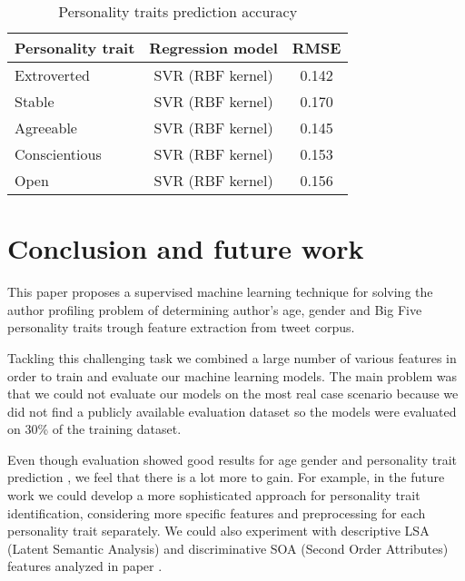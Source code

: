 \documentclass[10pt, a4paper]{article}
\begin{document}
\begin{table}[h]
\vspace{1mm}
\caption{Personality traits prediction accuracy}
\label{tab:narrow-table-4}
\vspace{-6mm}
\begin{center}
\begin{tabular}{lcc}
\midrule
Personality trait & Regression model & RMSE\\
\midrule
 Extroverted & SVR  (RBF kernel) & 0.142 \\
 Stable & SVR (RBF kernel)& 0.170 \\
 Agreeable & SVR  (RBF kernel)& 0.145 \\
 Conscientious & SVR  (RBF kernel)  & 0.153 \\
 Open & SVR  (RBF kernel) & 0.156 \\
\bottomrule
\end{tabular}
\end{center}
\end{table}
\par

\section{Conclusion and future work}

This paper proposes a supervised machine learning technique for solving the author profiling problem of determining author's age, gender and Big Five personality traits trough feature extraction from tweet corpus. 
\par
Tackling this challenging task we combined a large number of various features in order to train and evaluate our machine learning models. The main problem was that we could not evaluate our models on the most real case scenario because we did not find a publicly available evaluation dataset so the models were evaluated on 30\% of the training dataset.
\par
Even though evaluation showed good results for age gender and personality trait prediction  \citep{rangel2015}, we feel that there is a lot more to gain. For example, in the future work we could develop a more sophisticated approach for personality trait identification, considering more specific features and preprocessing for each personality trait separately. We could also experiment with descriptive LSA (Latent Semantic Analysis) and discriminative SOA (Second Order Attributes) features analyzed in paper \citep{escalante2015}.


 
\end{document}
